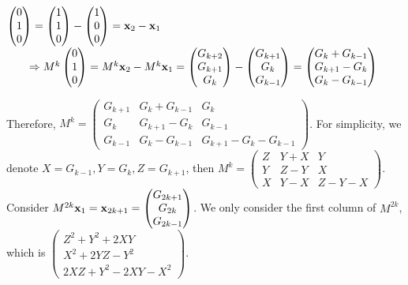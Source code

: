 \documentclass[answers]{exam}
\begin{document}
\begin{questions}
\begin{parts}
\begin{subparts}
\begin{solution}
                $\begin{pmatrix}0\\1\\0\end{pmatrix}=\begin{pmatrix}1\\1\\0\end{pmatrix}-\begin{pmatrix}1\\0\\0\end{pmatrix}=\bm{\mathrm{x}}_2-\bm{\mathrm{x}}_1 $\\
                \phantom{.}$\qquad\Rightarrow M^k\begin{pmatrix}0\\1\\0\end{pmatrix}=M^k\bm{\mathrm{x}}_2-M^k\bm{\mathrm{x}}_1=\begin{pmatrix}G_{k+2}\\G_{k+1}\\G_k\end{pmatrix}-\begin{pmatrix}G_{k+1}\\G_k\\G_{k-1}\end{pmatrix}=\begin{pmatrix}G_{k}+G_{k-1}\\G_{k+1}-G_k\\G_k-G_{k-1}\end{pmatrix}$

                Therefore, $M^k=\begin{pmatrix}G_{k+1} & G_k+G_{k-1} & G_k\\G_k & G_{k+1}-G_k & G_{k-1}\\G_{k-1} & G_k-G_{k-1} & G_{k+1}-G_k-G_{k-1}\end{pmatrix}$.
                For simplicity, we denote $X=G_{k-1}, Y=G_k, Z=G_{k+1}$, then $M^k=\begin{pmatrix}Z & Y+X & Y\\Y & Z-Y & X\\X & Y-X & Z-Y-X\end{pmatrix}$.
                Consider $M^{2k}\bm{\mathrm{x}}_1=\bm{\mathrm{x}}_{2k+1}=\begin{pmatrix}G_{2k+1}\\G_{2k}\\G_{2k-1}\end{pmatrix}$.
                We only consider the first column of $M^{2k}$, which is $\begin{pmatrix}
                    Z^2+Y^2+2XY \\
                    X^2+2YZ-Y^2 \\
                    2XZ+Y^2-2XY-X^2
                \end{pmatrix}$.


\end{solution}
\end{subparts}
\end{parts}
\end{questions}
\end{document}
